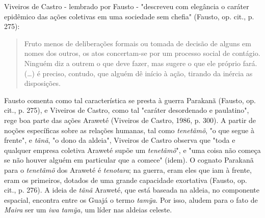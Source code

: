 Viveiros de Castro - lembrado por Fausto - "descreveu com elegância o
caráter epidêmico das ações coletivas em uma sociedade sem chefia"
(Fausto, op. cit., p. 275):

\begin{quote}
Fruto menos de deliberações formais ou tomada de decisão de alguns em
nomes dos outros, os atos concertam-se por um processo social de
contágio. Ninguém diz a outrem o que deve fazer, mas sugere o que ele
próprio fará. (\ldots{}) é preciso, contudo, que alguém dê início à ação,
tirando da inércia as disposições.
\end{quote}

Fausto comenta como tal característica se presta à guerra Parakanã
(Fausto, op. cit., p. 275), e Viveiros de Castro, como tal "caráter
desordenado e paulatino", rege boa parte das ações Araweté (Viveiros de
Castro, 1986, p. 300). A partir de noções específicas sobre as relações
humanas, tal como \emph{tenetãmõ}, "o que segue à frente", e
\emph{tãnã}, "o dono da aldeia", Viveiros de Castro observa que "toda e
qualquer empresa coletiva Araweté supõe um \emph{tenetãmõ}", e "uma
coisa não começa se não houver alguém em particular que a comece"
(idem). O cognato Parakanã para o \emph{tenetãmõ} dos Araweté é
\emph{tenotara}; na guerra, eram eles que iam à frente, eram os
primeiros, dotados de uma grande capacidade exortativa (Fausto, op.
cit., p. 276). A ideia de \emph{tãnã} Araweté, que está baseada na
aldeia, no componente espacial, encontra entre os Guajá o termo
\emph{tamỹa}. Por isso, aludem para o fato de \emph{Maira} ser um
\emph{iwa} \emph{tamỹa,} um líder nas aldeias celeste.

